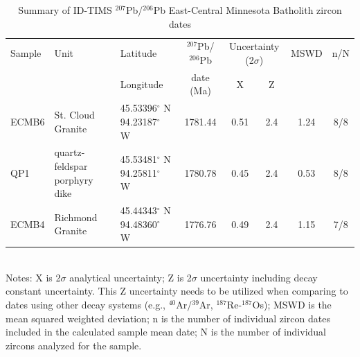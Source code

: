 \documentclass[draft]{agujournal2019}
\begin{document}
\begin{table}[h!]
\footnotesize
\caption{Summary of ID-TIMS $^{207}$Pb/$^{206}$Pb East-Central Minnesota Batholith zircon dates}
\begin{tabular}{p{1 cm}p{2.4 cm}p{1.8 cm}ccccc}
\hline
Sample & Unit & Latitude & $^{207}$Pb/$^{206}$Pb & \multicolumn{2}{c}{Uncertainty (2$\sigma$)} & MSWD & n/N \\
 &  & Longitude & date (Ma) & X & Z & & \\
\hline
ECMB6 & St. Cloud Granite & 45.53396$^{\circ}$ N 94.23187$^{\circ}$ W & 1781.44 & 0.51 & 2.4 & 1.24 & 8/8 \\
QP1 & quartz-feldspar porphyry dike & 45.53481$^{\circ}$ N 94.25811$^{\circ}$ W & 1780.78 & 0.45 & 2.4 & 0.53 & 8/8 \\
ECMB4 & Richmond Granite & 45.44343$^{\circ}$ N 94.48360$^{\circ}$ W & 1776.76 & 0.49 & 2.4 & 1.15 & 7/8 \\
\hline
\end{tabular}\\
Notes: X is 2$\sigma$ analytical uncertainty; Z is 2$\sigma$ uncertainty including decay constant uncertainty. This Z uncertainty needs to be utilized when comparing to dates using other decay systems (e.g., $^{40}$Ar/$^{39}$Ar, $^{187}$Re-$^{187}$Os); MSWD is the mean squared weighted deviation; n is the number of individual zircon dates included in the calculated sample mean date; N is the number of individual zircons analyzed for the sample.
\label{tab:geochron}
\end{table}

\end{document}
